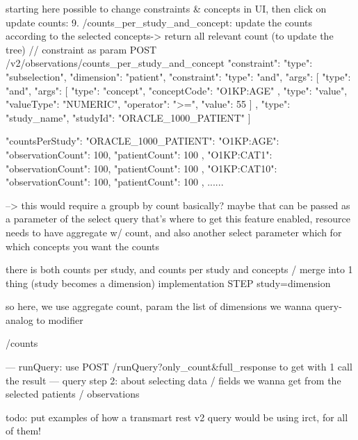 starting here possible to change constraints & concepts in UI, then click on update counts:
9. /counts\_per\_study\_and\_concept: update the counts according to the selected concepts-> return all relevant count (to update the tree) // constraint as param
POST /v2/observations/counts\_per\_study\_and\_concept
{
  "constraint": {
    "type": "subselection",
    "dimension": "patient",
    "constraint": {
      "type": "and",
      "args": [
        {
          "type": "and",
          "args": [
            {
              "type": "concept",
              "conceptCode": "O1KP:AGE"
            },
            {
              "type": "value",
              "valueType": "NUMERIC",
              "operator": ">=",
              "value": 55
            }
          ]
        },
        {
          "type": "study_name",
          "studyId": "ORACLE_1000_PATIENT"
        }
      ]
    }
  }
}

{
  "countsPerStudy": {
    "ORACLE_1000_PATIENT": {
      "O1KP:AGE": {
        "observationCount": 100,
        "patientCount": 100
      },
      "O1KP:CAT1": {
        "observationCount": 100,
        "patientCount": 100
      },
      "O1KP:CAT10": {
        "observationCount": 100,
        "patientCount": 100
      },
      ......
    }
  }
}

--> this would require a groupb by count basically? maybe that can be passed as a parameter of the select query
that's where to get this feature enabled, resource needs to have aggregate w/ count, and also another select parameter which for which concepts you want the counts

there is both counts per study, and counts per study and concepts / merge into 1 thing (study becomes a dimension)
implementation STEP study=dimension

so here, we use aggregate count, param the list of dimensions we wanna query-analog to modifier

/counts



---
runQuery: use POST /runQuery?only\_count\&full\_response to get with 1 call the result
--- query step 2: about selecting data  / fields we wanna get from the selected patients / observations 


todo: put examples of how a transmart rest v2 query would be using irct, for all of them!





